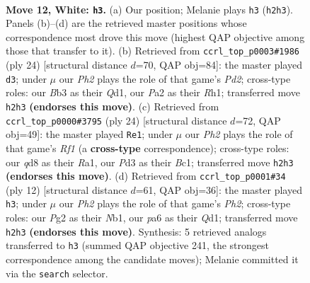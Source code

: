 \documentclass[11pt]{article}
\begin{document}
\clearpage

\begin{figure}[p]\centering
\begin{subfigure}{0.46\textwidth}\centering
\resizebox{\linewidth}{!}{%
\newchessgame
\chessboard[
  setfen={rnbqk2r/2p1bp2/p2p4/1p1Pp1pp/8/1B1P1N2/PPP2PPP/R1BQR1K1 w kq - 0 12},
  showmover=false,
  pgfstyle=straightmove, color=movearrow, markmove={h2-h3}
]}
\caption{}
\end{subfigure}\hfill
\begin{subfigure}{0.46\textwidth}\centering
\resizebox{\linewidth}{!}{%
\newchessgame
\chessboard[
  setfen={r1bqk2r/pp3ppp/5b2/nPp1p3/2PpP3/5NP1/PB1P1P1P/R2QKB1R w KQkq - 0 13},
  showmover=false,
  pgfstyle=straightmove, color=movearrow, markmove={d2-d3}
]}
\caption{}
\end{subfigure}
\\[4pt]
\begin{subfigure}{0.46\textwidth}\centering
\resizebox{\linewidth}{!}{%
\newchessgame
\chessboard[
  setfen={r3k2r/p1qpbppp/2b1p3/1p1nP3/8/P2B1N2/1PP2PPP/R1BQ1RK1 w kq - 0 13},
  showmover=false,
  pgfstyle=straightmove, color=movearrow, markmove={f1-e1}
]}
\caption{}
\end{subfigure}\hfill
\begin{subfigure}{0.46\textwidth}\centering
\resizebox{\linewidth}{!}{%
\newchessgame
\chessboard[
  setfen={rnbqkb1r/1pp2p2/p2ppn1p/6p1/2PP4/5NB1/PP2PPPP/RN1QKB1R w KQkq - 0 7},
  showmover=false,
  pgfstyle=straightmove, color=movearrow, markmove={h2-h3}
]}
\caption{}
\end{subfigure}
\caption{\textbf{Move 12, White: \texttt{h3}.} (a) Our position; Melanie plays \texttt{h3} (\texttt{h2h3}). Panels (b)--(d) are the retrieved master positions whose correspondence most drove this move (highest QAP objective among those that transfer to it). (b) Retrieved from \texttt{ccrl\_top\_p0003\#1986} (ply 24) [structural distance $d$=70, QAP obj=84]: the master played \texttt{d3}; under $\mu$ our \emph{Ph2} plays the role of that game's \emph{Pd2}; cross-type roles: our \emph{B}b3 as their \emph{Q}d1, our \emph{P}a2 as their \emph{R}h1; transferred move \texttt{h2h3} \textbf{(endorses this move)}. (c) Retrieved from \texttt{ccrl\_top\_p0000\#3795} (ply 24) [structural distance $d$=72, QAP obj=49]: the master played \texttt{Re1}; under $\mu$ our \emph{Ph2} plays the role of that game's \emph{Rf1} (a \textbf{cross-type} correspondence); cross-type roles: our \emph{q}d8 as their \emph{R}a1, our \emph{P}d3 as their \emph{B}c1; transferred move \texttt{h2h3} \textbf{(endorses this move)}. (d) Retrieved from \texttt{ccrl\_top\_p0001\#34} (ply 12) [structural distance $d$=61, QAP obj=36]: the master played \texttt{h3}; under $\mu$ our \emph{Ph2} plays the role of that game's \emph{Ph2}; cross-type roles: our \emph{P}g2 as their \emph{N}b1, our \emph{p}a6 as their \emph{Q}d1; transferred move \texttt{h2h3} \textbf{(endorses this move)}. Synthesis: 5 retrieved analogs transferred to \texttt{h3} (summed QAP objective 241, the strongest correspondence among the candidate moves); Melanie committed it via the \texttt{search} selector.}
\label{fig:thought-m22}
\end{figure}
\end{document}
